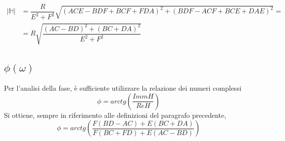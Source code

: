 \documentclass[leqno]{article}
\begin{document}
	\begin{equation}
		\label{Modulo h}
		\begin{aligned}
			|\mathbb{H}| &= \dfrac{R}{E^2+ F^2}\sqrt{(ACE-BDF+BCF+FDA)^2+ (BDF-ACF+BCE+DAE)^2} = \\
			&= R\sqrt{\dfrac{(AC-BD)^2 + (BC+DA)^2}{E^2 + F^2 }}  
		\end{aligned}
	\end{equation}
	
	
	\subsection{$\mathbb{\phi(\omega)}$}
	Per l'analisi della fase, è sufficiente utilizzare la relazione dei numeri complessi
	\begin{equation}
		\label{fase}
		\phi = arctg(\frac{Imm{H}}{Re{H}})
	\end{equation}
	Si ottiene, sempre in riferimento alle definizioni del paragrafo precedente,
	\begin{equation}
		\phi = arctg(\frac{F(BD-AC)+E(BC+DA)}{F(BC+FD)+E(AC-BD)})
		\label{Faseeq}
	\end{equation}
	
\end{document}
